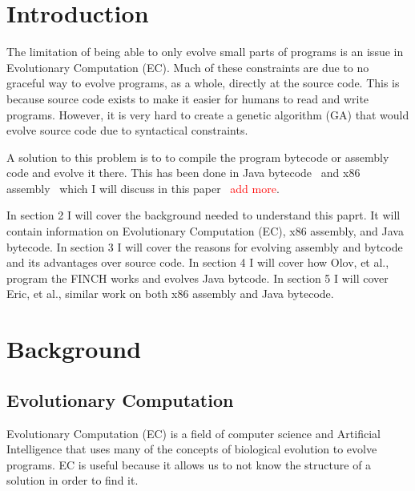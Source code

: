 \documentclass{sig-alternate}
\newcommand{\mycomment}[1]{\textcolor{red}{#1}}
\begin{document}
\keywords{}

\section{Introduction}
	The limitation of being able to only evolve small parts of programs is an issue in Evolutionary Computation (EC). Much of these constraints are due to no graceful way to evolve programs, as a whole, directly at the source code. This is because source code exists to make it easier for humans to read and write programs. However, it is very hard to create a genetic algorithm (GA) that would evolve source code due to syntactical constraints.\par
	A solution to this problem is to to compile the program bytecode or assembly code and evolve it there. This has been done in Java bytecode~\cite{FINCH:2011} and x86 assembly~\cite{Assembly:2010} which I will discuss in this paper ~\mycomment{add more}.
	
In section 2 I will cover the background needed to understand this paprt. It will contain information on Evolutionary Computation (EC), x86 assembly, and Java bytecode. In section 3 I will cover the reasons for evolving assembly and bytcode and its advantages over source code. In section 4 I will cover how Olov, et al.,~\cite{FINCH:2011} program the FINCH works and evolves Java bytcode. In section 5 I will cover Eric, et al., similar work on both x86 assembly and Java bytecode.  
	
	

\section{Background}

\subsection{Evolutionary Computation}
Evolutionary Computation (EC) is a field of computer science and Artificial Intelligence that uses many of the concepts of biological evolution to evolve programs. EC is useful because it allows us to not know the structure of a solution in order to find it. \par
\end{document}
